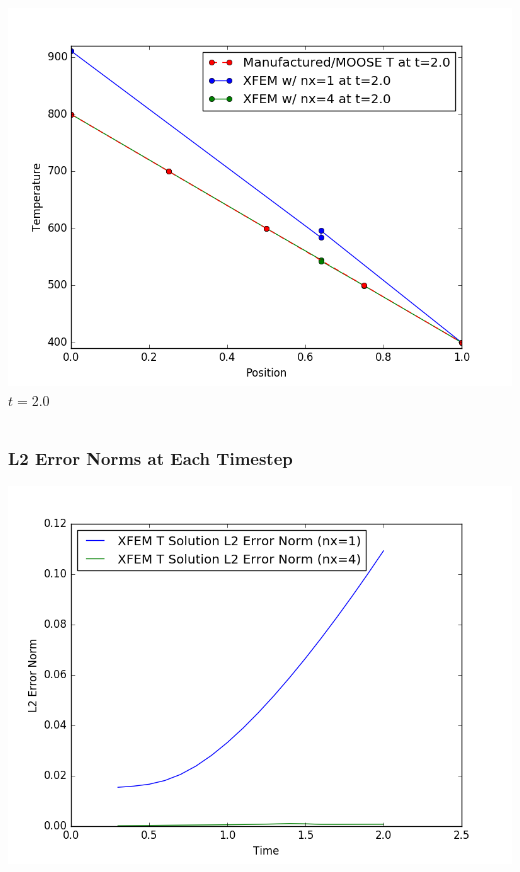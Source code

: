 \documentclass[]{beamer}
\begin{document}
\begin{frame}[t]
\begin{columns}
\begin{center}
			\includegraphics[scale=0.17]{figures/1D_xy_homog1mat_u_vs_x_20}\\
			$t=2.0$
			\end{center}
	\end{columns}
\end{frame}

\begin{frame}[t]\frametitle{L2 Error Norms at Each Timestep}
	\begin{center}
		\includegraphics[scale=0.4]{figures/1D_xy_homog1mat_L2_Errs}
	\end{center}
\end{frame}
\end{document}
